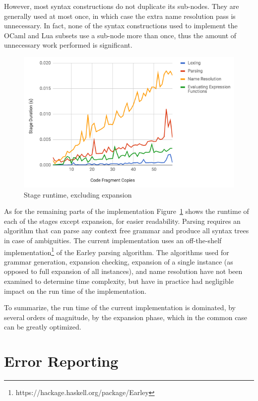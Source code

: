 \documentclass{kththesis}
\begin{document}
However, most syntax constructions do not duplicate its sub-nodes. They are generally used at most once, in which case the extra name resolution pass is unnecessary. In fact, none of the syntax constructions used to implement the OCaml and Lua subsets use a sub-node more than once, thus the amount of unnecessary work performed is significant.

\begin{figure}[t]
\includegraphics[width=\textwidth]{resources/performance-graph-without-expansion}
\caption{Stage runtime, excluding expansion}
\label{fig:performance-graph-without-expansion}
\end{figure}

As for the remaining parts of the implementation Figure~\ref{fig:performance-graph-without-expansion} shows the runtime of each of the stages except expansion, for easier readability. Parsing requires an algorithm that can parse any context free grammar and produce all syntax trees in case of ambiguities. The current implementation uses an off-the-shelf implementation\footnote{https://hackage.haskell.org/package/Earley} of the Earley \cite{Earley1970An-Efficient-Co} parsing algorithm. The algorithms used for grammar generation, expansion checking, expansion of a single instance (as opposed to full expansion of all instances), and name resolution have not been examined to determine time complexity, but have in practice had negligible impact on the run time of the implementation.

To summarize, the run time of the current implementation is dominated, by several orders of magnitude, by the expansion phase, which in the common case can be greatly optimized.

\section{Error Reporting} \label{sec:error-reporting}
\end{document}
